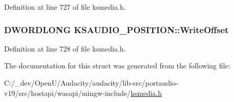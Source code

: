 Definition at line 727 of file ksmedia.\+h.

\subsubsection[{\texorpdfstring{Write\+Offset}{WriteOffset}}]{\setlength{\rightskip}{0pt plus 5cm}D\+W\+O\+R\+D\+L\+O\+NG K\+S\+A\+U\+D\+I\+O\+\_\+\+P\+O\+S\+I\+T\+I\+O\+N\+::\+Write\+Offset}\hypertarget{struct_k_s_a_u_d_i_o___p_o_s_i_t_i_o_n_a47768664ecfd962c7e926e5fdee573c1}{}\label{struct_k_s_a_u_d_i_o___p_o_s_i_t_i_o_n_a47768664ecfd962c7e926e5fdee573c1}


Definition at line 728 of file ksmedia.\+h.



The documentation for this struct was generated from the following file\+:\begin{DoxyCompactItemize}
\item 
C\+:/\+\_\+dev/\+Open\+U/\+Audacity/audacity/lib-\/src/portaudio-\/v19/src/hostapi/wasapi/mingw-\/include/\hyperlink{ksmedia_8h}{ksmedia.\+h}\end{DoxyCompactItemize}
